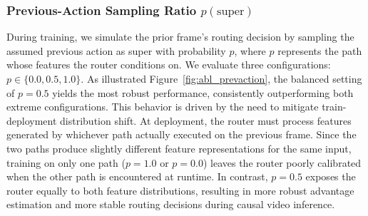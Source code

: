 \subsubsection{Previous-Action Sampling Ratio $p(\mathrm{super})$}
\label{sec:abl_prevaction}

During training, we simulate the prior frame's routing decision by sampling the assumed previous action as super with probability $p$, where $p$ represents the path whose features the router conditions on. 
We evaluate three configurations: $p \in \{0.0, 0.5, 1.0\}$. 
As illustrated Figure~\ref{fig:abl_prevaction}, the balanced setting of $p = 0.5$ yields the most robust performance, consistently outperforming both extreme configurations.
This behavior is driven by the need to mitigate train-deployment distribution shift. 
At deployment, the router must process features generated by whichever path actually executed on the previous frame. 
Since the two paths produce slightly different feature representations for the same input, training on only one path ($p=1.0$ or $p=0.0$) leaves the router poorly calibrated when the other path is encountered at runtime. 
In contrast, $p=0.5$ exposes the router equally to both feature distributions, resulting in more robust advantage estimation and more stable routing decisions during causal video inference.


